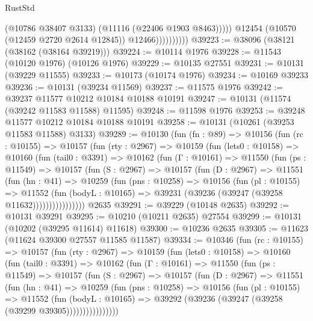 \begin{lexlean}{RustStd}
\begin{coremodule}
                              (@10786 @38407 @3133)
                              (@11116 (@22406 @1903 @8463)))))
                        @12454
                        (@10570 (@12459 @2720 @2614 @12845))
                        @12466))))))))))
@39223 := @38096 (@38121 (@38162 (@38164 @39219)))
@39224 := @10114 @1976
@39228 := @11543 (@10120 @1976) (@10126 @1976)
@39229 := @10135 @27551
@39231 := @10131 (@39229 @11555)
@39233 := @10173 (@10174 @1976)
@39234 := @10169 @39233
@39236 := @10131 (@39234 @11569)
@39237 := @11575 @1976
@39242 := @39237 @11577 @10212 @10184 @10188 @10191
@39247 := @10131 (@11574 (@39242 @11583 @11588) @11595)
@39248 := @11598 @1976
@39253 := @39248 @11577 @10212 @10184 @10188 @10191
@39258 := @10131 (@10261 (@39253 @11583 @11588) @3133)
@39289 := @10130
    (fun (fn : @89) =>
    @10156
      (fun (rc : @10155) =>
      @10157
        (fun (rty : @2967) =>
        @10159
          (fun (lets0 : @10158) =>
          @10160
            (fun (tail0 : @3391) =>
            @10162
              (fun (Γ : @10161) =>
              @11550
                (fun (ps : @11549) =>
                @10157
                  (fun (S : @2967) =>
                  @10157
                    (fun (D : @2967) =>
                    @11551
                      (fun (hn : @41) =>
                      @10259
                        (fun (pns : @10258) =>
                        @10156
                          (fun (pl : @10155) =>
                          @11552
                            (fun (bodyL : @10165) =>
                            @39231 (@39236 (@39247 (@39258 @11632))))))))))))))))
    @2635
@39291 := @39229 (@10148 @2635)
@39292 := @10131 @39291
@39295 := @10210 (@10211 @2635) @27554
@39299 := @10131 (@10202 (@39295 @11614) @11618)
@39300 := @10236 @2635
@39305 := @11623 (@11624 @39300 @27557 @11585 @11587)
@39334 := @10346
    (fun (rc : @10155) =>
    @10157
      (fun (rty : @2967) =>
      @10159
        (fun (lets0 : @10158) =>
        @10160
          (fun (tail0 : @3391) =>
          @10162
            (fun (Γ : @10161) =>
            @11550
              (fun (ps : @11549) =>
              @10157
                (fun (S : @2967) =>
                @10157
                  (fun (D : @2967) =>
                  @11551
                    (fun (hn : @41) =>
                    @10259
                      (fun (pns : @10258) =>
                      @10156
                        (fun (pl : @10155) =>
                        @11552
                          (fun (bodyL : @10165) =>
                          @39292 (@39236 (@39247 (@39258 (@39299 @39305))))))))))))))))

\end{coremodule}
\end{lexlean}
